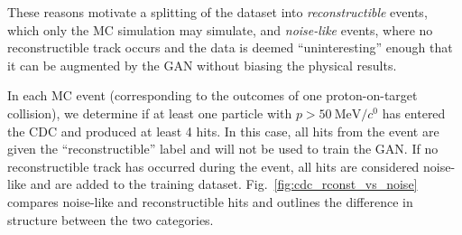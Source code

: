 These reasons motivate a splitting of the dataset into \emph{reconstructible} events, which only the MC simulation may simulate, and \emph{noise-like} events, where no reconstructible track occurs and the data is deemed ``uninteresting'' enough that it can be augmented by the GAN without biasing the physical results. 


In each MC event (corresponding to the outcomes of one proton-on-target collision), we determine if at least one particle with $p > \SI{50}{\MeV/\clight}$ has entered the CDC and produced at least 4 hits. In this case, all hits from the event are given the ``reconstructible'' label and will not be used to train the GAN. If no reconstructible track has occurred during the event, all hits are considered noise-like and are added to the training dataset. Fig.~\ref{fig:cdc_rconst_vs_noise} compares noise-like and reconstructible hits and outlines the difference in structure between the two categories. 

